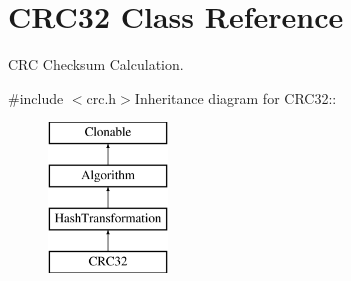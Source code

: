 \hypertarget{class_c_r_c32}{
\section{CRC32 Class Reference}
\label{class_c_r_c32}
}


CRC Checksum Calculation.  


{\ttfamily \#include $<$crc.h$>$}Inheritance diagram for CRC32::\begin{figure}[H]
\begin{center}
\leavevmode
\includegraphics[height=4cm]{class_c_r_c32}
\end{center}
\end{figure}
